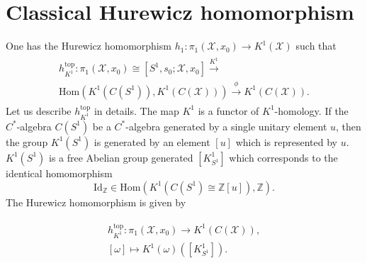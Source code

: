 \documentclass{beamer}
\theoremstyle{plain}
\newcommand{\Z}{\mathbb{Z}}                  %
\newcommand{\om}{\omega}                     %
\newcommand{\Id}{\mathrm{Id}}
\newcommand{\Hom}{\mathrm{Hom}}
\newcommand{\sX}{\mathcal{X}}       %
\newcommand{\bean}{\begin{eqnarray*}}
\newcommand{\eean}{\end{eqnarray*}}
\begin{document}
\section{Classical Hurewicz homomorphism}
\begin{frame}
	One has the  \alert{Hurewicz homomorphism} 	$h_1:\pi_1\left(\sX, x_0 \right)\to K^1\left(\sX \right)$ such that
	\bean
	\begin{split}
		h^{\mathrm{top}}_{K^1}	:\pi_1\left(\sX, x_0 \right)\cong \left[S^1, s_0; \sX, x_0\right]\xrightarrow{K^1}\\ \Hom\left(K^1\left(C\left( S^1\right)  \right), K^1\left(C\left( \sX \right) \right)\right) \xrightarrow {\phi} K^1\left(C\left( \sX \right) \right).
	\end{split}
	\eean
	Let us describe $h^{\mathrm{top}}_{K^1}$ in details. The map $K^1$ is a functor of $K^1$-homology. 
	If the $C^*$-algebra  $C\left( S^1\right)$ be a $C^*$-algebra generated by a single unitary element $u$, then the group $K^1\left( S^1\right)$  is generated by an element $\left[u\right]$ which is represented by $u$.  $K^1\left( S^1\right)$ is a free Abelian group generated  $\left[ 	K^1_{S^1}\right]$ which corresponds to the identical homomorphism $$\Id_\Z \in \Hom\left( K^1\left(C\left( S^1\right) \cong \Z \left[u\right] \right), \Z \right).$$  
	The Hurewicz homomorphism is given by
	
	\bean
	\begin{split}
		h^{\mathrm{top}}_{K^1}	:\pi_1\left(\sX, x_0 \right)\to K^1\left(C\left( \sX \right) \right),\\
		\left[\om \right] \mapsto K^1\left( \om \right) \left( \left[ 	K^1_{S^1}\right]\right) .
	\end{split}
	\eean
	
	
\end{frame}
\end{document}
